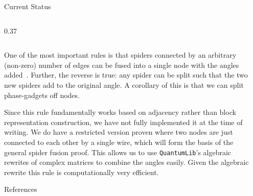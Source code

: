\documentclass[final]{beamer}
\newlength{\sepwidth}
\newlength{\colwidth}
\newcommand{\separatorcolumn}{\begin{column}{\sepwidth}\end{column}}
\newcommand{\QLib}{\texttt{QuantumLib}\xspace}
\begin{document}
\begin{frame}[t]
\begin{columns}[t]
\begin{column}{\colwidth}
\begin{block}{Current Status}
\begin{columns}
\begin{column}{0.37\colwidth}
      \end{column}

    \end{columns}

One of the most important rules is that spiders connected by an arbitrary (non-zero) number of edges can be fused into a single node with the angles added~\cite{vandewetering2020zxcalculus}.
%
Further, the reverse is true: any spider can be split such that the two new spiders add to the original angle.
A corollary of this is that we can split phase-gadgets off nodes.

Since this rule fundamentally works based on adjacency rather than block representation construction, we have not fully implemented it at the time of writing.
We do have a restricted version proven where two nodes are just connected to each other by a single wire, which will form the basis of the general spider fusion proof.
This allows us to use \QLib's algebraic rewrites of complex matrices to combine the angles easily.
Given the algebraic rewrite this rule is computationally very efficient.

  \end{block}

  \begin{block}{References}

    {\small }

  \end{block}

\end{column}

\separatorcolumn
\end{columns}
\end{frame}
\end{document}

